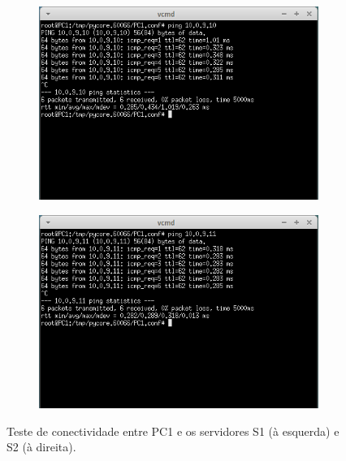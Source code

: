 \documentclass{llncs}
\begin{document}
\begin{figure}[h]
	\centering
	\begin{subfigure}{.5\textwidth}
		\centering
		\includegraphics[width=0.75\linewidth]{./imagens/PC1_S1.png}
	\end{subfigure}%
	\begin{subfigure}{.5\textwidth}
		\centering
		\includegraphics[width=0.75\linewidth]{./imagens/PC1_S2.png}
	\end{subfigure}
	\caption{Teste de conectividade entre PC1 e os servidores S1 (à esquerda) e S2 (à direita).}
	\label{fig:pc1_s}
\end{figure}
\end{document}
